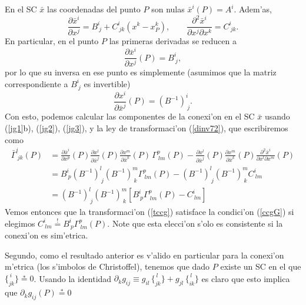 En el SC $\bar{x}$ las coordenadas del punto $P$ son nulas $\bar{x}^i(P)=A^i$. Adem'as,
\begin{equation}
\frac{\partial\bar{x}^i}{\partial x^j}=B^i_{\ j}+C^i_{\ jk}(x^k-x^k_P), \qquad \frac{\partial^2\bar{x}^i}{\partial x^j\partial x^k}=C^i_{\ jk}. \label{jg1}
\end{equation}
En particular, en el punto $P$ las primeras derivadas se reducen a
\begin{equation}\label{jg2}
\frac{\partial\bar{x}^i}{\partial x^j}(P)=B^i_{\ j},
\end{equation}
por lo que su inversa en ese punto es simplemente (asumimos que la matriz correspondiente a $B^i_{\ j}$ es invertible)
\begin{equation}\label{jg3}
\frac{\partial x^i}{\partial \bar{x}^j}(P)=(B^{-1})^i_{\ j}.
\end{equation}
Con esto, podemos calcular las componentes de la conexi'on en el SC $\bar{x}$ usando (\ref{jg1}b), (\ref{jg2}), (\ref{jg3}), y la ley de transformaci'on (\ref{dinv72}), que escribiremos como
\begin{align}
\bar{\Gamma}_{\ jk}^i(P) &= \frac{\partial\bar{x}^i}{\partial x^p }(P)\frac{\partial
x^l}{\partial\bar{x}^j }(P)\frac{\partial x^m}{\partial\bar{x}^k }(P)\,
\Gamma_{\ lm}^p(P) -\frac{\partial x^l}{\partial \bar{x}^j}(P)\frac{\partial x^m}{\partial \bar{x}^k}(P)\frac{\partial^2\bar{x}^i}{\partial x^l \partial x^m }(P) \\
&= B^i_{\ p}(B^{-1})^l_{\ j}(B^{-1})^m_{\ k}\Gamma^p_{\ lm}(P)-(B^{-1})^l_{\ j}(B^{-1})^m_{\ k}C^i_{\ lm} \\
&= (B^{-1})^l_{\ j}(B^{-1})^m_{\ k}\left[B^i_{\ p}\Gamma^p_{\ lm}(P)-C^i_{\ lm}\right]
\end{align}
Vemos entonces que la transformaci'on (\ref{tccg}) satisface la condici'on (\ref{ccgG}) si elegimos $C^i_{\ lm}\stackrel{!}{=}B^i_{\ p}\Gamma^p_{\ lm}(P)$. Note que esta elecci'on s'olo es consistente si la conexi'on es sim'etrica.

Segundo, como el resultado anterior es v'alido en particular para la conexi'on m'etrica (los s'imbolos de Christoffel), tenemos que dado $P$ existe un SC en el que $\{^{\,i}_{jk}\}\stackrel{*}{=}0$. Usando la identidad $\partial_kg_{ij}\equiv g_{il}\,\{ ^{\, l} _{jk}\}+g_{jl}\,\{ ^{\, l} _{ik}\}$ es claro que esto implica que $\partial_kg_{ij}(P)\stackrel{*}{=}0$

